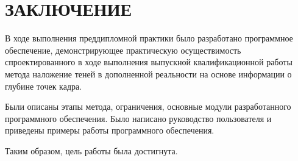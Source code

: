 \chapter*{ЗАКЛЮЧЕНИЕ}

В ходе выполнения преддипломной практики было разработано программное обеспечение, демонстрирующее практическую осуществимость спроектированного в ходе выполнения выпускной квалификационной работы метода наложение теней в дополненной реальности на основе информации о глубине точек кадра. 

Были описаны этапы метода, ограничения, основные модули разработанного программного обеспечения. Было написано руководство пользователя и приведены примеры работы программного обеспечения.

Таким образом, цель работы была достигнута.